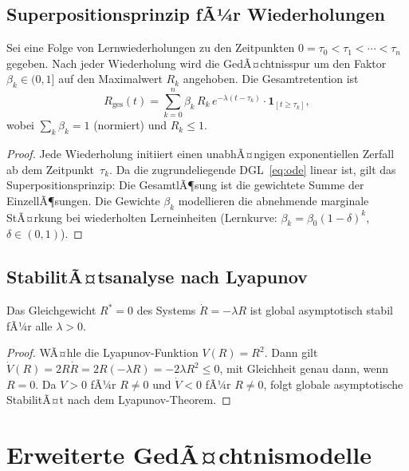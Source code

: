 ﻿\documentclass[12pt,a4paper,twoside]{article}
\theoremstyle{theormstyle}
\theoremstyle{proofstyle}
\begin{document}
	\subsection{Superpositionsprinzip fÃ¼r Wiederholungen}
	
		Sei eine Folge von Lernwiederholungen zu den Zeitpunkten
		$0 = \tau_0 < \tau_1 < \cdots < \tau_n$ gegeben.
		Nach jeder Wiederholung wird die GedÃ¤chtnisspur um den Faktor $\beta_k \in (0,1]$
		auf den Maximalwert $R_k$ angehoben. Die Gesamtretention ist
		\[
		R_{\mathrm{ges}}(t) = \sum_{k=0}^{n} \beta_k\,R_k\,e^{-\lambda(t-\tau_k)}
		\cdot \mathbf{1}_{[t \geq \tau_k]},
		\]
		wobei $\sum_k \beta_k = 1$ (normiert) und $R_k \leq 1$.
	
	\begin{proof}
		Jede Wiederholung initiiert einen unabhÃ¤ngigen exponentiellen Zerfall
		ab dem Zeitpunkt~$\tau_k$. Da die zugrundeliegende DGL~\eqref{eq:ode}
		linear ist, gilt das Superpositionsprinzip: Die GesamtlÃ¶sung ist die gewichtete
		Summe der EinzellÃ¶sungen. Die Gewichte $\beta_k$ modellieren die abnehmende
		marginale StÃ¤rkung bei wiederholten Lerneinheiten
		(Lernkurve: $\beta_k = \beta_0(1-\delta)^k$, $\delta \in (0,1)$).
	\end{proof}
	
	\subsection{StabilitÃ¤tsanalyse nach Lyapunov}
	
		Das Gleichgewicht $R^* = 0$ des Systems $\dot{R} = -\lambda R$ ist
		global asymptotisch stabil fÃ¼r alle $\lambda > 0$.
	
	\begin{proof}
		WÃ¤hle die Lyapunov-Funktion $V(R) = R^2$. Dann gilt
		$\dot{V}(R) = 2R\dot{R} = 2R(-\lambda R) = -2\lambda R^2 \leq 0$,
		mit Gleichheit genau dann, wenn $R = 0$.
		Da $V > 0$ fÃ¼r $R \neq 0$ und $\dot{V} < 0$ fÃ¼r $R \neq 0$,
		folgt globale asymptotische StabilitÃ¤t nach dem Lyapunov-Theorem.
	\end{proof}
	
	\section{Erweiterte GedÃ¤chtnismodelle}
	\label{sec:modelle}
	
\end{document}
